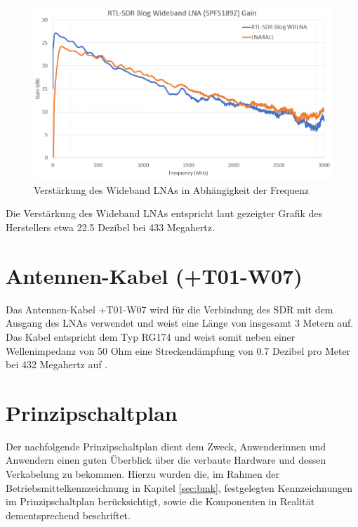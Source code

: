 \begin{figure}[H]
	\centering
	\includegraphics[width=.75\linewidth]{../ref/wideband_lna_gain.png}
	\caption{Verstärkung des Wideband LNAs in Abhängigkeit der Frequenz \cite{noauthor_new_nodate}}
	\label{fig:wideband_lna_gain}
\end{figure}

Die Verstärkung des Wideband LNAs entspricht laut gezeigter Grafik des Herstellers etwa 22.5 Dezibel bei 433 Megahertz.

\section{Antennen-Kabel (+T01-W07)}
Das Antennen-Kabel +T01-W07 wird für die Verbindung des SDR mit dem Ausgang des LNAs verwendet und weist eine Länge von insgesamt 3 Metern auf. Das Kabel entspricht dem Typ RG174 und weist somit neben einer Wellenimpedanz von 50 Ohm eine Streckendämpfung von 0.7 Dezibel pro Meter bei 432 Megahertz auf \cite{noauthor_dunnes_nodate}.

\section{Prinzipschaltplan}
Der nachfolgende Prinzipschaltplan dient dem Zweck, Anwenderinnen und Anwendern einen guten Überblick über die verbaute Hardware und dessen Verkabelung zu bekommen. Hierzu wurden die, im Rahmen der Betriebsmittelkennzeichnung in Kapitel \ref{sec:bmk}, festgelegten Kennzeichnungen im Prinzipschaltplan berücksichtigt, sowie die Komponenten in Realität dementsprechend beschriftet.

